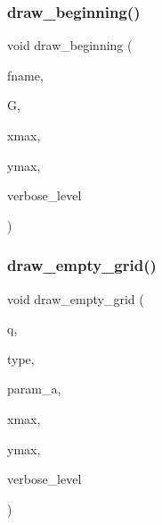 \subsubsection{\texorpdfstring{draw\+\_\+beginning()}{draw\_beginning()}}
{\footnotesize\ttfamily void draw\+\_\+beginning (\begin{DoxyParamCaption}\item[{char $\ast$}]{fname,  }\item[{\mbox{\hyperlink{classmp__graphics}{mp\+\_\+graphics}} $\ast$\&}]{G,  }\item[{\mbox{\hyperlink{galois_8h_a09fddde158a3a20bd2dcadb609de11dc}{I\+NT}}}]{xmax,  }\item[{\mbox{\hyperlink{galois_8h_a09fddde158a3a20bd2dcadb609de11dc}{I\+NT}}}]{ymax,  }\item[{\mbox{\hyperlink{galois_8h_a09fddde158a3a20bd2dcadb609de11dc}{I\+NT}}}]{verbose\+\_\+level }\end{DoxyParamCaption})}

\mbox{\label{field_8_c_a0d28d1958c704e954ef7bb377a58c811}} 
\subsubsection{\texorpdfstring{draw\+\_\+empty\+\_\+grid()}{draw\_empty\_grid()}}
{\footnotesize\ttfamily void draw\+\_\+empty\+\_\+grid (\begin{DoxyParamCaption}\item[{\mbox{\hyperlink{galois_8h_a09fddde158a3a20bd2dcadb609de11dc}{I\+NT}}}]{q,  }\item[{\mbox{\hyperlink{galois_8h_a09fddde158a3a20bd2dcadb609de11dc}{I\+NT}}}]{type,  }\item[{\mbox{\hyperlink{galois_8h_a09fddde158a3a20bd2dcadb609de11dc}{I\+NT}}}]{param\+\_\+a,  }\item[{\mbox{\hyperlink{galois_8h_a09fddde158a3a20bd2dcadb609de11dc}{I\+NT}}}]{xmax,  }\item[{\mbox{\hyperlink{galois_8h_a09fddde158a3a20bd2dcadb609de11dc}{I\+NT}}}]{ymax,  }\item[{\mbox{\hyperlink{galois_8h_a09fddde158a3a20bd2dcadb609de11dc}{I\+NT}}}]{verbose\+\_\+level }\end{DoxyParamCaption})}

\mbox{\label{field_8_c_aa7a3dc8d6361a7ba3753a74bdc72b44a}} 
